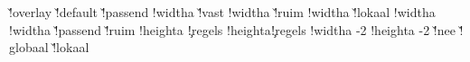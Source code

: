 {     \@@localoffset{}
   \else\ifx\localoffset\v!overlay
     \boxhasoffsetfalse
     \boxhasstrutfalse
     \boxisoverlaidtrue
     \@@localoffset\zeropoint
   \else
     \boxhasoffsettrue
     \boxhasstruttrue
     \boxisoverlaidfalse
     \ifx\localoffset\v!default %
       \let\localoffset\defaultframeoffset
     \else
       \let{}\localoffset
     \fi
     \@@localoffset\localoffset
     \advance\@@localoffset {}
   \fi\fi
   \ifx\localwidth\v!passend
     \ifboxhasformat
       \boxhaswidthtrue
       \!!widtha\hsize
     \else
       \boxhaswidthfalse
     \fi
   \else\ifx\localwidth\v!vast %
     \ifboxhasformat
       \boxhaswidthtrue
       \!!widtha\hsize
     \else
       \boxhaswidthfalse
     \fi
   \else\ifx\localwidth\v!ruim
     \boxhaswidthtrue
     \!!widtha\hsize
   \else\ifx\localwidth\v!lokaal
     \boxhaswidthtrue
     \setlocalhsize
     \!!widtha\localhsize
   \else
     \boxhaswidthtrue
     \!!widtha\localwidth
   \fi\fi\fi\fi
   \ifx\localheight\v!passend
     \boxhasheightfalse %
   \else\ifx\localheight\v!ruim
     \boxhasheightfalse
   \else
     \boxhasheighttrue
     \!!heighta\localheight
   \fi\fi
   \ifboxhasheight
   \else
       {\ifcase\framedparameter\c!regels\else
          \!!heighta\framedparameter\c!regels\lineheight
          \edef\localheight{\the\!!heighta}%
          \boxhasheighttrue
        \fi}%
   \fi
   \advance\!!widtha  -2\@@localoffset
   \advance\!!heighta -2\@@localoffset
   \ifx\localstrut\v!nee
     \boxhasstrutfalse
   \else\ifx\localstrut\v!globaal
     \setstrut
   \else\ifx\localstrut\v!lokaal
     \setfontstrut
   \fi\fi\fi
   \ifboxhasstrut
     \setstrut
     \let\localbegstrut\begstrut
     \let\localendstrut\endstrut
     \let\localstrut   \strut
   \else
     \let\localbegstrut\pseudobegstrut %
     \let\localendstrut\pseudoendstrut %
     \let\localstrut   \pseudostrut    %
}
